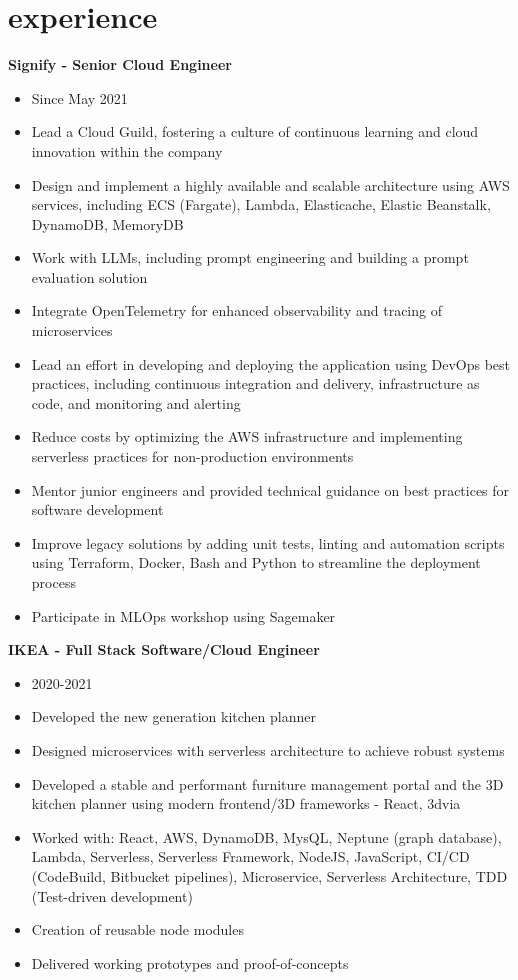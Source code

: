 \documentclass[]{friggeri-cv}
\begin{document}
\section{experience}

\textbf{Signify - Senior Cloud Engineer}
\begin{itemize}
  \item Since May 2021
  \item Lead a Cloud Guild, fostering a culture of continuous learning and cloud innovation within the company
  \item Design and implement a highly available and scalable architecture using AWS services, including ECS (Fargate), Lambda, Elasticache, Elastic Beanstalk, DynamoDB, MemoryDB
  \item Work with LLMs, including prompt engineering and building a prompt evaluation solution
  \item Integrate OpenTelemetry for enhanced observability and tracing of microservices
  \item Lead an effort in developing and deploying the application using DevOps best practices, including continuous integration and delivery, infrastructure as code, and monitoring and alerting
  \item Reduce costs by optimizing the AWS infrastructure and implementing serverless practices for non-production environments
  \item Mentor junior engineers and provided technical guidance on best practices for software development
  \item Improve legacy solutions by adding unit tests, linting and automation scripts using Terraform, Docker, Bash and Python to streamline the deployment process
  \item Participate in MLOps workshop using Sagemaker
\end{itemize}

\textbf{IKEA - Full Stack Software/Cloud Engineer}
\begin{itemize}
  \item 2020-2021
  \item Developed the new generation kitchen planner
  \item Designed microservices with serverless architecture to achieve robust systems
  \item Developed a stable and performant furniture management portal and the 3D kitchen planner using modern frontend/3D frameworks - React, 3dvia
  \item Worked with: React, AWS, DynamoDB, MysQL, Neptune (graph database), Lambda, Serverless, Serverless Framework, NodeJS, JavaScript, CI/CD (CodeBuild, Bitbucket pipelines), Microservice, Serverless Architecture, TDD (Test-driven development)
  \item Creation of reusable node modules
  \item Delivered working prototypes and proof-of-concepts
\end{itemize}
\end{document}
